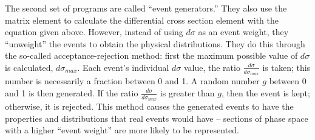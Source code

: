 The second set of programs are called ``event generators.''  
They also use the matrix element to calculate 
the differential cross section element %
with the equation given above.  
However, instead of using $d\sigma$ as an event weight, 
they ``unweight'' the events to obtain the physical 
distributions.  
They do this through the so-called acceptance-rejection method: 
first the maximum possible value of $d\sigma$ is calculated, 
$d\sigma_{max}$. 
Each event's individual $d\sigma$ value, 
the ratio $\frac{d\sigma}{d\sigma_{max}}$ is taken; 
this number is necessarily a fraction between 0 and 1.  
A random number $g$ between 0 and 1 is then generated.  
If the ratio $\frac{d\sigma}{d\sigma_{max}}$ is greater 
than $g$, then the event is kept; %
otherwise, it is rejected.  
This method causes the generated events to have the properties 
and distributions that real events would have -- %
sections of phase space with a higher ``event weight'' 
are more likely to be represented.  




